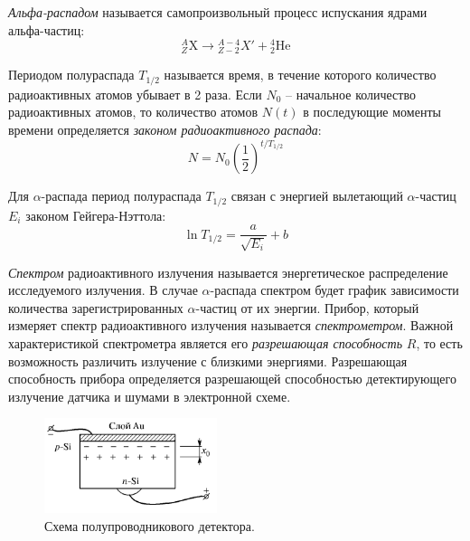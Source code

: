 \documentclass[a4paper, 12pt]{article}
\newcommand{\elem}[3]{{}^{#2}_{#3}\text{#1}}
\begin{document}
    \textit{Альфа-распадом} называется самопроизвольный процесс испускания ядрами альфа-частиц:
    $$
    \elem{X}{A}{Z} \rightarrow \elem{$X'$}{A-4}{Z-2} + \elem{He}{4}{2}
    $$

    Периодом полураспада $T_{1/2}$ называется время, в течение которого количество радиоактивных атомов убывает в 2 раза. Если $N_0$ -- начальное количество радиоактивных атомов, то количество атомов $N(t)$ в последующие моменты времени определяется \textit{законом радиоактивного распада}:
    $$
    N = N_0  \left(\frac{1}{2}\right)^{t / T_{1/2}}
    $$

    Для $\alpha$-распада период полураспада $T_{1/2}$ связан с энергией вылетающий $\alpha$-частиц $E_i$ законом Гейгера-Нэттола:
    \begin{equation}
        \ln T_{1/2} = \frac{a}{\sqrt{E_i}} + b
        \label{eq:geiger_nuttall_law}
    \end{equation}
	
    \textit{Спектром} радиоактивного излучения называется энергетическое распределение исследуемого излучения. В случае $\alpha$-распада спектром будет график зависимости количества зарегистрированных $\alpha$-частиц от их энергии. Прибор, который измеряет спектр радиоактивного излучения называется \textit{спектрометром}. Важной характеристикой спектрометра является его \textit{разрешающая способность} $R$, то есть возможность различить излучение с близкими энергиями. Разрешающая способность прибора определяется разрешающей способностью детектирующего излучение датчика и шумами в электронной схеме.
	
    \begin{figure}[H]
        \centering
        \includegraphics[width=0.45\textwidth]{images/detector.png}
        \caption{Схема полупроводникового детектора.}
        \label{img:detector}
    \end{figure}
\end{document}

